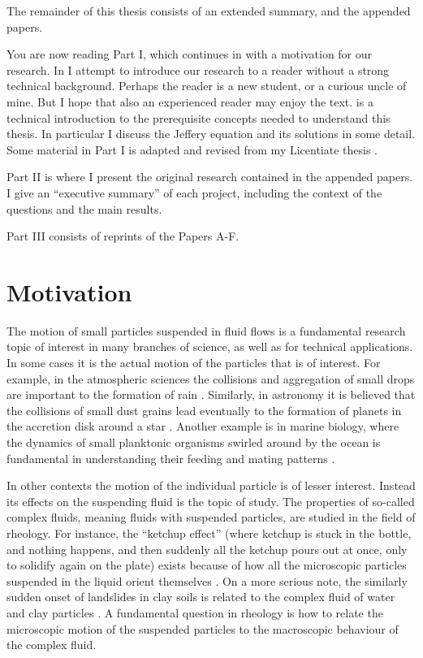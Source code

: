 \documentclass[thesis.tex]{subfiles}
\begin{document}
The remainder of this thesis consists of an extended summary, and the appended papers.

You are now reading Part I, which continues in  with a motivation for our research.
In  I attempt to introduce our research to a reader without a strong technical background. Perhaps the reader is a new student, or a curious uncle of mine. But I hope that also an experienced reader may enjoy the text.
 is a technical introduction to the prerequisite concepts needed to understand this thesis. In particular I discuss the Jeffery equation and its solutions in some detail. 
Some material in Part I is adapted and revised from my Licentiate thesis \cite{lic}.

Part II is where I present the original research contained in the appended papers. I give an ``executive summary'' of each project, including the context of the questions and the main results.

Part III consists of reprints of the Papers A-F.


\chapter{Motivation}\label{sec:motivation}

The motion of small particles suspended in fluid flows is a fundamental research topic of interest in many branches of science, as well as for technical applications. In some cases it is the actual motion of the particles that is of interest. For example, in the atmospheric sciences the collisions and aggregation of small drops are important to the formation of rain \cite{devenish2012}. Similarly, in astronomy it is believed that the collisions of small dust grains lead eventually to the formation of planets in the accretion disk around a star \cite{wilkinson2008}. Another example is in marine biology, where the dynamics of small planktonic organisms swirled around by the ocean is fundamental in understanding their feeding and mating patterns \cite{guasto2012}. 

In other contexts the motion of the individual particle is of lesser interest. Instead its effects on the suspending fluid is the topic of study. The properties of so-called complex fluids, meaning fluids with suspended particles, are studied in the field of rheology. For instance, the ``ketchup effect'' (where ketchup is stuck in the bottle, and nothing happens, and then suddenly all the ketchup pours out at once, only to solidify again on the plate) exists because of how all the microscopic particles suspended in the liquid orient themselves \cite{bayod2008}. On a more serious note, the similarly sudden onset of landslides in clay soils is related to the complex fluid of water and clay particles \cite{coussot2002}. A fundamental question in rheology is how to relate the microscopic motion of the suspended particles to the macroscopic behaviour of the complex fluid.
\end{document}
